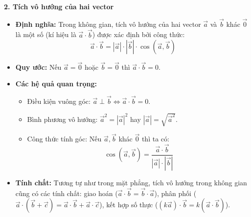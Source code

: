 \documentclass[12pt]{article}
\begin{document}
	\textbf{2. Tích vô hướng của hai vector}
	\begin{itemize}
		\item \textbf{Định nghĩa:} Trong không gian, tích vô hướng của hai vector $\vec{a}$ và $\vec{b}$ khác $\vec{0}$ là một số (kí hiệu là $\vec{a} \cdot \vec{b}$) được xác định bởi công thức:
		$$ \vec{a} \cdot \vec{b} = |\vec{a}| \cdot |\vec{b}| \cdot \cos(\vec{a}, \vec{b}) $$
		\item \textbf{Quy ước:} Nếu $\vec{a} = \vec{0}$ hoặc $\vec{b} = \vec{0}$ thì $\vec{a} \cdot \vec{b} = 0$.
		\item \textbf{Các hệ quả quan trọng:}
		\begin{itemize}
			\item Điều kiện vuông góc: $\vec{a} \perp \vec{b} \Leftrightarrow \vec{a} \cdot \vec{b} = 0$.
			\item Bình phương vô hướng: $\vec{a}^2 = |\vec{a}|^2$ hay $|\vec{a}| = \sqrt{\vec{a}^2}$.
			\item Công thức tính góc: Nếu $\vec{a}, \vec{b}$ khác $\vec{0}$ thì ta có:
			$$ \cos(\vec{a}, \vec{b}) = \frac{\vec{a} \cdot \vec{b}}{|\vec{a}| \cdot |\vec{b}|} $$
		\end{itemize}
		\item \textbf{Tính chất:} Tương tự như trong mặt phẳng, tích vô hướng trong không gian cũng có các tính chất: giao hoán ($\vec{a}\cdot\vec{b} = \vec{b}\cdot\vec{a}$), phân phối ($\vec{a}\cdot(\vec{b} + \vec{c}) = \vec{a}\cdot\vec{b} + \vec{a}\cdot\vec{c}$), kết hợp số thực ($(k\vec{a})\cdot\vec{b} = k(\vec{a}\cdot\vec{b})$).
	\end{itemize}
	
\end{document}
